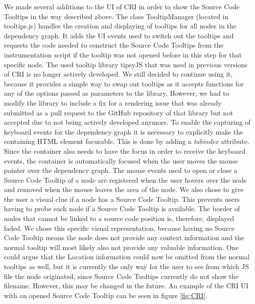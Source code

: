 We made several additions to the UI of CRI in order to show the Source Code Tooltips in the way described above. The class TooltipManager (located in tooltips.js) handles the creation and displaying of tooltips for all nodes in the dependency graph. It adds the UI events used to switch out the tooltips and requests the code needed to construct the Source Code Tooltips from the instrumentation script if the tooltip was not opened before in this step for that specific node. The used tooltip library tipsyJS \cite{Tipsy} that was used in previous versions of CRI is no longer actively developed. We still decided to continue using it, because it provides a simple way to swap out tooltips as it accepts functions for any of the options passed as parameters to the library. However, we had to modify the library to include a fix for a rendering issue that was already submitted as a pull request to the GitHub repository of that library but not accepted due to not being actively developed anymore. To enable the capturing of keyboard events for the dependency graph it is necessary to explicitly make the containing HTML element focusable. This is done by adding a \emph{tabindex} attribute. Since the container also needs to have the focus in order to receive the keyboard events, the container is automatically focused when the user moves the mouse pointer over the dependency graph. The mouse events used to open or close a Source Code Tooltip of a node are registered when the user hovers over the node and removed when the mouse leaves the area of the node. We also chose to give the user a visual clue if a node has a Source Code Tooltip. This prevents users having to probe each node if a Source Code Tooltip is available. The border of nodes that cannot be linked to a source code position is, therefore, displayed faded. We chose this specific visual representation, because having no Source Code Tooltip means the node does not provide any context information and the normal tooltip will most likely also not provide any valuable information. One could argue that the Location information could now be omitted from the normal tooltips as well, but it is currently the only way for the user to see from which JS file the node originated, since Source Code Tooltips currently do not show the filename. However, this may be changed in the future. An example of the CRI UI with an opened Source Code Tooltip can be seen in figure \ref{fig:CRI}.
	
